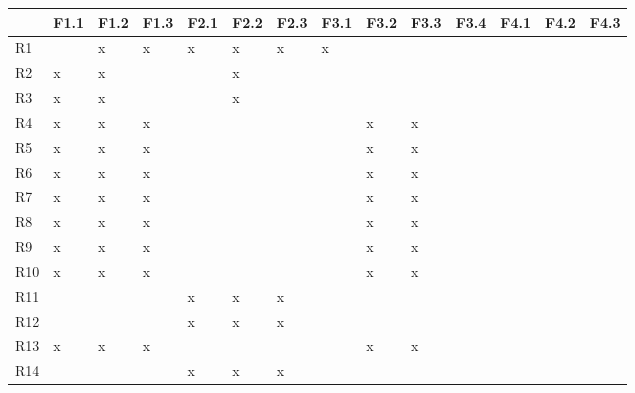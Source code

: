 \begin{center}
\footnotesize
    \begin{longtable}[!htb]{| m{2em} || m{2em} | m{2em}| m{2em}| m{2em}| m{2em}| m{2em}| m{2em}| m{2em}| m{2em}| m{2em}| m{2em}| m{2em}| m{2em}|}
    \hline
    &F1.1 &F1.2 &F1.3 &F2.1 &F2.2 &F2.3 &F3.1 &F3.2 &F3.3 &F3.4 &F4.1 &F4.2 &F4.3\\
    \hline\hline
    R1 & & \cellcolor{gr}x &\cellcolor{gr}x &\cellcolor{gr}x & \cellcolor{gr}x&\cellcolor{gr}x&\cellcolor{gr}x & & & & & & \\
    \hline
    R2 &\cellcolor{gr}x &\cellcolor{gr}x & & &\cellcolor{gr}x & & & & & & & &\\
    \hline
    R3 &\cellcolor{gr}x & \cellcolor{gr}x& & &\cellcolor{gr}x & & & & & & & &\\
    \hline
    R4 &\cellcolor{gr}x &\cellcolor{gr}x &\cellcolor{gr}x & & & & &\cellcolor{gr}x &\cellcolor{gr}x & & & &\\
    \hline
    R5 &\cellcolor{gr}x &\cellcolor{gr}x &\cellcolor{gr}x & & & & &\cellcolor{gr}x &\cellcolor{gr}x & & & &\\
    \hline
    R6 &\cellcolor{gr}x &\cellcolor{gr}x &\cellcolor{gr}x & & & & &\cellcolor{gr}x &\cellcolor{gr}x & & & &\\
    \hline
    R7 &\cellcolor{gr}x &\cellcolor{gr}x &\cellcolor{gr}x & & & & &\cellcolor{gr}x &\cellcolor{gr}x & & & &\\
    \hline
    R8 &\cellcolor{gr}x &\cellcolor{gr}x &\cellcolor{gr}x & & & & &\cellcolor{gr}x &\cellcolor{gr}x & & & &\\
    \hline
    R9 &\cellcolor{gr}x &\cellcolor{gr}x &\cellcolor{gr}x & & & & &\cellcolor{gr}x &\cellcolor{gr}x & & & &\\
    \hline
    R10 &\cellcolor{gr}x &\cellcolor{gr}x &\cellcolor{gr}x & & & & &\cellcolor{gr}x &\cellcolor{gr}x & & & &\\
    \hline
    R11 & & & &\cellcolor{gr}x &\cellcolor{gr}x & \cellcolor{gr}x& & & & & & &\\
    \hline
    R12 & & & &\cellcolor{gr}x &\cellcolor{gr}x &\cellcolor{gr}x & & & & & & &\\
    \hline
    R13 &\cellcolor{gr}x &\cellcolor{gr}x &\cellcolor{gr}x & & & & &\cellcolor{gr}x &\cellcolor{gr}x & & & &\\
    \hline
    R14 & & & &\cellcolor{gr}x &\cellcolor{gr}x &\cellcolor{gr}x & & & & & & &\\

\end{longtable}
\end{center}
